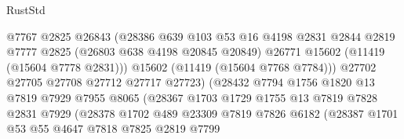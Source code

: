 \begin{lexlean}{RustStd}
\begin{coremodule}
                                    @7767
                                    @2825
                                    @26843
                                    (@28386
                                      @639
                                      @103
                                      @53
                                      @16
                                      @4198
                                      @2831
                                      @2844
                                      @2819
                                      @7777
                                      @2825
                                      (@26803 @638 @4198 @20845 @20849)
                                      @26771
                                      @15602
                                      (@11419 (@15604 @7778 @2831)))
                                    @15602
                                    (@11419 (@15604 @7768 @7784)))
                                  @27702
                                  @27705
                                  @27708
                                  @27712
                                  @27717
                                  @27723)
                                (@28432
                                  @7794
                                  @1756
                                  @1820
                                  @13
                                  @7819
                                  @7929
                                  @7955
                                  @8065
                                  (@28367
                                    @1703
                                    @1729
                                    @1755
                                    @13
                                    @7819
                                    @7828
                                    @2831
                                    @7929
                                    (@28378
                                      @1702
                                      @489
                                      @23309
                                      @7819
                                      @7826
                                      @6182
                                      (@28387
                                        @1701
                                        @53
                                        @55
                                        @4647
                                        @7818
                                        @7825
                                        @2819
                                        @7799

\end{coremodule}
\end{lexlean}
